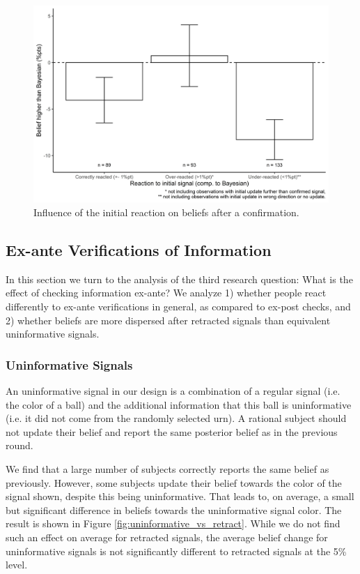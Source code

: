 \documentclass{article}
\begin{document}
\begin{figure}
    \centering
    \includegraphics[width=12cm]{Fig/02_fig_confirm_diff_restricted.jpg}
    \caption{Influence of the initial reaction on beliefs after a confirmation.}
    \label{fig:confirm_diff_restricted}
\end{figure}


\subsection{Ex-ante Verifications of Information}

In this section we turn to the analysis of the third research question: What is the effect of checking information ex-ante? We analyze 1) whether people react differently to ex-ante verifications in general, as compared to ex-post checks, and 2) whether beliefs are more dispersed after retracted signals than equivalent uninformative signals.

\subsubsection{Uninformative Signals}
An uninformative signal in our design is a combination of a regular signal (i.e. the color of a ball) and the additional information that this ball is uninformative (i.e. it did not come from the randomly selected urn). A rational subject should not update their belief and report the same posterior belief as in the previous round. 

We find that a large number of subjects correctly reports the same belief as previously. However, some subjects update their belief towards the color of the signal shown, despite this being uninformative. That leads to, on average, a small but significant difference in beliefs towards the uninformative signal color. The result is shown in Figure \ref{fig:uninformative_vs_retract}. While we do not find such an effect on average for retracted signals, the average belief change for uninformative signals is not significantly different to retracted signals at the 5\% level.
\end{document}

